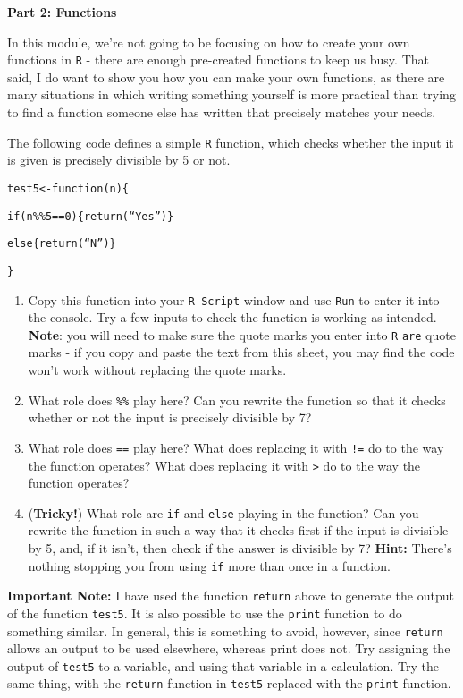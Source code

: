 \documentclass[11pt,a4paper]{article}
\begin{document}
\vspace{0.2cm}

\textbf{Part 2: Functions} 

  In this module, we're not going to be focusing on how to create your own functions in \texttt{R} - there are enough pre-created functions to keep us busy. That said, I do want to show you how you can make your own functions, as there are many situations in which writing something yourself is more practical than trying to find a function someone else has written that precisely matches your needs.

The following code defines a simple \texttt{R} function, which checks whether the input it is given is precisely divisible by 5 or not.
 

\texttt{test5<-function(n)\{}

\texttt{if(n\%\%5==0)\{return(``Yes'')\}}

\texttt{else\{return(``N'')\}}
 
\texttt{\}}

\begin{enumerate}

\item Copy this function into your \texttt{R Script} window and use \texttt{Run} to enter it into the console. Try a few inputs to check the function is working as intended. \textbf{Note}: you will need to make sure the quote marks you enter into \texttt{R} \texttt{are} quote marks - if you copy and paste the text from this sheet, you may find the code won't work without replacing the quote marks.
\item What role does \texttt{\%\%} play here? Can you rewrite the function so that it checks whether or not the input is precisely divisible by 7?
\item What role does \texttt{==} play here? What does replacing it with \texttt{!=} do to the way the function operates? What does replacing it with \texttt{>} do to the way the function operates?
\item (\textbf{Tricky!}) What role are \texttt{if} and \texttt{else} playing in the function? Can you rewrite the function in such a way that it checks first if the input is divisible by 5, and, if it isn't, then check if the answer is divisible by 7? \textbf{Hint:} There's nothing stopping you from using \texttt{if} more than once in a function.

\end{enumerate}

\textbf{Important Note:} I have used the function \texttt{return} above to generate the output of the function \texttt{test5}. It is also possible to use the \texttt{print} function to do something similar. In general, this is something to avoid, however, since \texttt{return} allows an output to be used elsewhere, whereas print does not. Try assigning the output of \texttt{test5} to a variable, and using that variable in a calculation. Try the same thing, with the \texttt{return} function in \texttt{test5} replaced with the \texttt{print} function.
 
\end{document}

